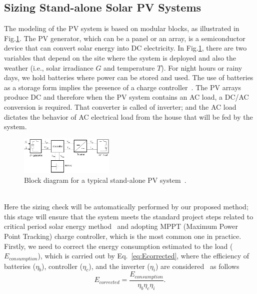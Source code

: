 \documentclass[10pt,conference]{IEEEtran}
\begin{document}
\subsection{Sizing Stand-alone Solar PV Systems}
\label{sec:sizing}
The modeling of the PV system is based on modular blocks, as illustrated in Fig.\ref{fig:blockdiagram}. %
The PV generator, which can be a panel or an array, is a semiconductor device that can convert solar energy into DC electricity. In Fig.\ref{fig:blockdiagram}, there are two variables that depend on the site where the system is deployed and also the weather (i.e., solar irradiance $G$ and temperature $T$). For night hours or rainy days, we hold batteries where power can be stored and used. The use of batteries as a storage form implies the presence of a charge controller~\cite{Hansen}. The PV arrays produce DC and therefore when the PV system contains an AC load, a DC/AC conversion is required. That converter is called of inverter; and the AC load dictates the behavior of AC electrical load from the house that will be fed by the system.
\begin{figure}[h]
\includegraphics[width=0.4\textwidth]{blockdiagramPVS2}
\centering
\caption{Block diagram for a typical stand-alone PV system~\cite{Hansen}.}
\label{fig:blockdiagram} 
\end{figure}
\\

Here the sizing check will be automatically performed by our proposed method; 
this stage will ensure that the system meets the standard project steps related 
to critical period solar energy method~\cite{Pinho} and 
adopting MPPT (Maximum Power Point Tracking) charge controller, 
which is the most common one in practice. 
%
Firstly, we need to correct the energy consumption estimated to the load ($E_{consumption}$), which is carried out by Eq.~\eqref{eq:Ecorrected}, where the efficiency of batteries ($\eta_{b}$), controller ($\eta_{c}$), and the inverter ($\eta_{i}$) are considered~\cite{Pinho} as follows
\begin{equation}
\label{eq:Ecorrected}
\scriptstyle E_{corrected} = \dfrac{\scriptstyle E_{consumption}}{ \scriptstyle \eta_{b} \eta_{c} \eta_{i} }.
\end{equation}
\end{document}
